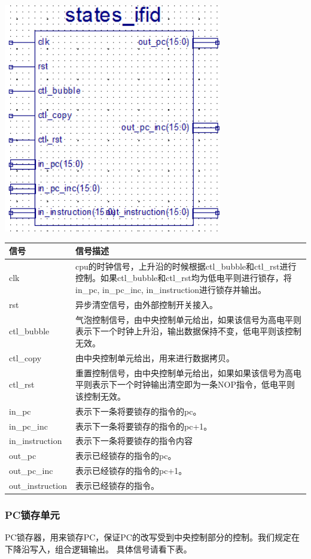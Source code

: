\begin{center}
    \includegraphics[height=10cm]{image/detail/detail_0.png}

    \begin{tabular}{|p{3.5cm}|p{11cm}|}
        \hline 信号 & 信号描述 \\
        \hline clk & cpu的时钟信号，上升沿的时候根据ctl\_bubble和ctl\_rst进行控制。如果ctl\_bubble和ctl\_rst均为低电平则进行锁存，将in\_pc, in\_pc\_inc, in\_instruction进行锁存并输出。 \\
        \hline rst & 异步清空信号，由外部控制开关接入。 \\
        \hline ctl\_bubble & 气泡控制信号，由中央控制单元给出，如果该信号为高电平则表示下一个时钟上升沿，输出数据保持不变，低电平则该控制无效。 \\
        \hline ctl\_copy &  由中央控制单元给出，用来进行数据拷贝。\\
        \hline ctl\_rst & 重置控制信号，由中央控制单元给出，如果如果该信号为高电平则表示下一个时钟输出清空即为一条NOP指令，低电平则该控制无效。 \\
        \hline in\_pc & 表示下一条将要锁存的指令的pc。 \\
        \hline in\_pc\_inc & 表示下一条将要锁存的指令的pc+1。 \\
        \hline in\_instruction & 表示下一条将要锁存的指令内容 \\
        \hline out\_pc & 表示已经锁存的指令的pc。 \\
        \hline out\_pc\_inc & 表示已经锁存的指令的pc+1。 \\
        \hline out\_instruction & 表示已经锁存的指令。 \\
        \hline
    \end{tabular}

\end{center}
    

\subsubsection{PC锁存单元}
    PC锁存器，用来锁存PC，保证PC的改写受到中央控制部分的控制。我们规定在下降沿写入，组合逻辑输出。
    具体信号请看下表。